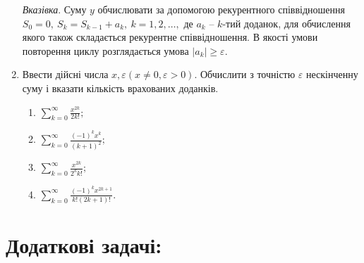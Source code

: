 \documentclass[a5paper,titlepage,openany,twoside,
]
{book_unv}%
\makeatletter
\newcommand{\xslalph}[1]{\expandafter\@xslalph\csname c@#1\endcsname}
\newcommand{\@xslalph}[1]{%
    \ifcase#1\or а\or б\or в\or г\or д\or e\or є\or ж\or з\or i%
    \or й\or к\or л\or м\or н\or о\or п\or р\or с\or т%
    \or у\or ф\or х\or ц\or ч\or ш\or ю\or я\or аа\or бб\or вв%
    \else\@ctrerr\fi%
}
\makeatother
\begin{document}
\begin{enumerate}
\begin{enumerate}[label=\xslalph*)]
\end{enumerate}

\emph{\emph{Вказівка}}. Суму $y$ обчислювати за допомогою
рекурентного співвідношення
\(S_{0} = 0,\ S_{k} = S_{k - 1} + a_{k},\ k = 1,2,\ldots,\) де
\(a_{k}\) -- \(k\)-тий доданок, для обчислення якого також складається
рекурентне співвідношення. В якості умови повторення циклу розглядається
умова \(\left| a_{k} \right| \geq \varepsilon.\)

\item
  Ввести дійсні числа
  \(x,\varepsilon (x \neq 0,\varepsilon > 0)\). Обчислити з
  точністю \(\varepsilon\) нескінченну суму і вказати кількість
  врахованих доданків.
  \begin{multicols}{2}
\begin{enumerate}[label=\xslalph*)]
\item \(\sum\limits_{k = 0}^{\infty}\frac{x^{2k}}{2k!};\) 
\item \(\sum\limits_{k = 0}^{\infty}\frac{(-1)^{k}x^{k}}{(k + 1)^{2}};\)
\item \(\sum\limits_{k = 0}^{\infty}\frac{x^{2k}}{2^{k}k!};\) 
\item \(\sum\limits_{k = 0}^{\infty}\frac{(-1)^{k}x^{2k + 1}}{k!(2k + 1)!}.\)
\end{enumerate}
 \end{multicols}

\end{enumerate}

\section{Додаткові задачі:}
\end{document}
